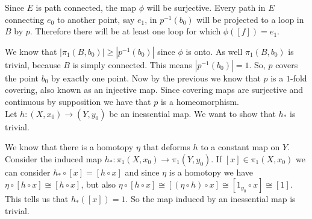 \documentclass[12pt]{report}
\begin{document}
Since $E$ is path connected, the map $\phi$ will be surjective. Every path in
$E$ connecting $e_0$ to another point, say $e_1$, in $p^{-1}(b_0)$ will be
projected to a loop in $B$ by $p$. Therefore there will be at least one loop
for which $\phi([f]) = e_1$.

We know that $|\pi_1(B,b_0)| \geq |p^{-1}(b_0)|$ since $\phi$ is onto. As well
$\pi_1(B,b_0)$ is trivial, because $B$ is simply connected. This means
$|p^{-1}(b_0)| = 1$. So, $p$ covers the point $b_0$ by exactly one point. Now
by the previous we know that $p$ is a $1$-fold covering, also known as an
injective map. Since covering maps are surjective and continuous by supposition
we have that $p$ is a homeomorphism.\\

 Let $h: (X,x_0) \to (Y,y_0)$ be an inessential map.
We want to show that $h_*$ is trivial.

We know that there is a homotopy $\eta$ that deforms $h$ to a constant map on
$Y$. Consider the induced map $h_*: \pi_1(X,x_0) \to \pi_1(Y,y_0)$. If $[x] \in
\pi_1(X,x_0)$ we can consider $h_* \circ[x] = [h \circ x]$ and since $\eta$ is a
homotopy we have $\eta \circ [h \circ x] \cong [h \circ x]$, but also $\eta
\circ [h \circ x] \cong [(\eta \circ h) \circ x] \cong [1_{y_0} \circ x] \cong
[1]$. This tells us that $h_*([x]) = 1$. So the map induced by an inessential
map is trivial.
\end{document}
